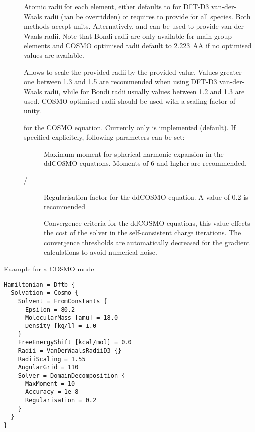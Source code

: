 \begin{description}
  \item[] Atomic radii for each element, either defaults to
     for DFT-D3 van-der-Waals radii (can be overridden)
    or requires to provide  for all species.
    Both methods accept  units.
    Alternatively,  and 
    can be used to provide van-der-Waals radii. Note that Bondi radii\cite{mantina2009}
    are only available for main group elements and COSMO optimised radii default to
    2.223~AA if no optimised values are available.

  \item[] Allows to scale the provided radii by the provided value.
    Values greater one between 1.3 and 1.5 are recommended when using DFT-D3 van-der-Waals
    radii, while for Bondi radii usually values between 1.2 and 1.3 are used.
    COSMO optimised radii should be used with a scaling factor of unity.

  \item[] for the COSMO equation. Currently only
     is implemented (default). If specified
    explicitely, following parameters can be set:

    \begin{description}
      \item[]
        Maximum moment for spherical harmonic expansion in the ddCOSMO equations.
        Moments of 6 and higher are recommended.
      \item[ / ]
        Regularisation factor for the ddCOSMO equation. A value of 0.2 is recommended
      \item[]
        Convergence criteria for the ddCOSMO equations, this value effects the cost
        of the solver in the self-consistent charge iterations.
        The convergence thresholds are automatically decreased for the gradient
        calculations to avoid numerical noise.
    \end{description}
\end{description}

Example for a COSMO model

\begin{verbatim}
Hamiltonian = Dftb {
  Solvation = Cosmo {
    Solvent = FromConstants {
      Epsilon = 80.2
      MolecularMass [amu] = 18.0
      Density [kg/l] = 1.0
    }
    FreeEnergyShift [kcal/mol] = 0.0
    Radii = VanDerWaalsRadiiD3 {}
    RadiiScaling = 1.55
    AngularGrid = 110
    Solver = DomainDecomposition {
      MaxMoment = 10
      Accuracy = 1e-8
      Regularisation = 0.2
    }
  }
}
\end{verbatim}

